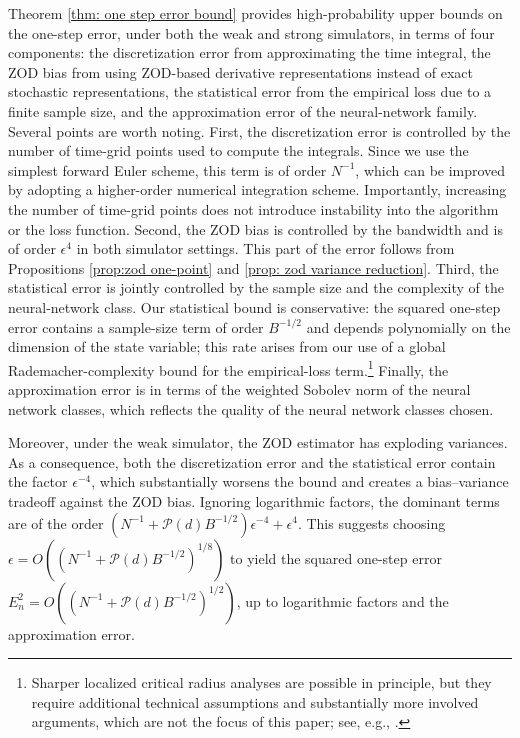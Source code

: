 \documentclass[twoside,11pt]{article}
\newcommand{\1}{\mathbf{1}}
\numberwithin{equation}{section}
\begin{document}


Theorem \ref{thm: one step error bound} provides high-probability upper bounds on the one-step error,  under both the weak and strong simulators,  in terms of four components: the discretization error from approximating the time integral, the ZOD bias from using ZOD-based derivative representations instead of exact stochastic representations, the statistical error from the  empirical loss due to a finite sample size, and the approximation error of the neural-network family. Several points are worth noting. First, the discretization error is controlled by the number of time-grid points used to compute the integrals. Since we use the simplest forward Euler scheme, this term is of order $N^{-1}$, which can be improved by adopting a higher-order numerical integration scheme. Importantly, increasing the number of time-grid points does not introduce instability into the algorithm or the loss function. Second, the ZOD bias is controlled by the bandwidth and is of order $\epsilon^4$ in both simulator settings. This part of the error follows from Propositions \ref{prop:zod one-point} and \ref{prop: zod variance reduction}. Third, the statistical error is jointly controlled by the sample size and the complexity of the neural-network class. Our statistical bound is conservative: the squared one-step error contains a sample-size term of order \(B^{-1/2}\) and depends polynomially on the dimension of the state variable; this rate arises from our use of a global Rademacher-complexity bound for the empirical-loss term.\footnote{%
Sharper localized critical radius analyses are possible in principle, but they require additional technical assumptions and substantially more involved arguments, which are not the focus of this paper; see, e.g., \citet{bartlett2005Local,wainwright2019HighDimensional}.} Finally, the approximation error is in terms of the weighted Sobolev norm of the neural network classes, which reflects the quality of  the neural network classes chosen.

Moreover, under the weak simulator, the ZOD estimator has exploding variances. As a consequence, both the discretization error and the statistical error contain the factor $\epsilon^{-4}$, which substantially worsens the bound and creates a bias--variance tradeoff against the ZOD bias. Ignoring logarithmic factors, the dominant terms are of the order $(N^{-1}+\mathcal P(d)B^{-1/2})\epsilon^{-4}+\epsilon^4$. This suggests choosing  $\epsilon=O((N^{-1}+\mathcal P(d)B^{-1/2})^{1/8})$ to yield the squared one-step error $E_n^2=O((N^{-1}+\mathcal P(d)B^{-1/2})^{1/2})$, up to logarithmic factors and the approximation error.
\end{document}
